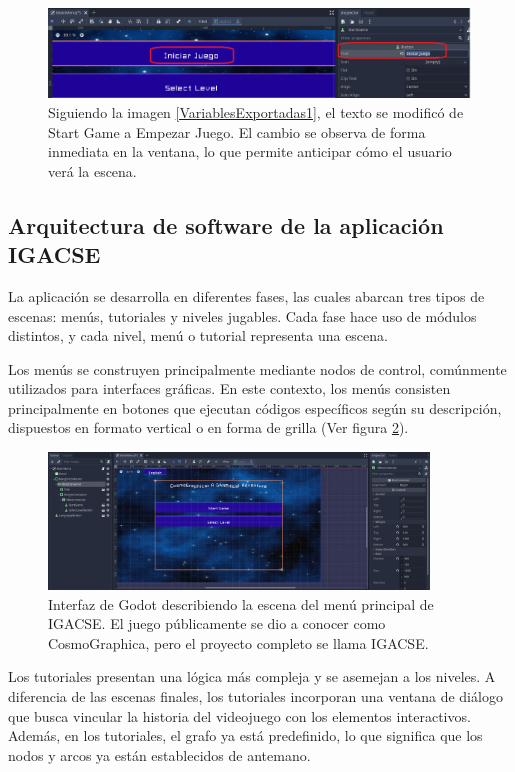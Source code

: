 \begin{figure}[h]
	\centering
	\includegraphics[scale=0.4]{imagenes/VariablesExportadas2.png}
	\caption{Siguiendo la imagen \ref{VariablesExportadas1}, el texto se modificó de Start Game a Empezar Juego. El cambio se observa de forma inmediata en la ventana, lo que permite anticipar cómo el usuario verá la escena.}
	\label{VariablesExportadas2}
\end{figure}


\subsection{Arquitectura de software de la aplicación IGACSE}

La aplicación se desarrolla en diferentes fases, las cuales abarcan tres tipos de escenas: menús, tutoriales y niveles jugables. Cada fase hace uso de módulos distintos, y cada nivel, menú o tutorial representa una escena.

Los menús se construyen principalmente mediante nodos de control, comúnmente utilizados para interfaces gráficas. En este contexto, los menús consisten principalmente en botones que ejecutan códigos específicos según su descripción, dispuestos en formato vertical o en forma de grilla (Ver figura \ref{GodotMenuInterface}).

\begin{figure}[h]
	\centering
	\includegraphics[width=0.9\textwidth]{imagenes/GodotInterfaceMainMenu.png}
	\caption{Interfaz de Godot describiendo la escena del menú principal de IGACSE. El juego públicamente se dio a conocer como CosmoGraphica, pero el proyecto completo se llama IGACSE.}
	\label{GodotMenuInterface}
\end{figure}


Los tutoriales presentan una lógica más compleja y se asemejan a los niveles. A diferencia de las escenas finales, los tutoriales incorporan una ventana de diálogo que busca vincular la historia del videojuego con los elementos interactivos. Además, en los tutoriales, el grafo ya está predefinido, lo que significa que los nodos y arcos ya están establecidos de antemano.

